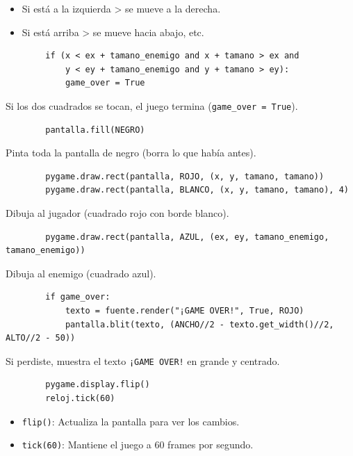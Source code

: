 \documentclass[11.5pt]{article}
\begin{document}
	\begin{itemize}
		\item Si está a la izquierda > se mueve a la derecha.
		\item 	Si está arriba > se mueve hacia abajo, etc.
	\end{itemize}
	
	\begin{verbatim}
		if (x < ex + tamano_enemigo and x + tamano > ex and
			y < ey + tamano_enemigo and y + tamano > ey):
			game_over = True
	\end{verbatim}
	
	Si los dos cuadrados se tocan, el juego termina (\verb|game_over = True|).
	
	\begin{verbatim}
		pantalla.fill(NEGRO)
	\end{verbatim}
	
	Pinta toda la pantalla de negro (borra lo que había antes).
	
	\begin{verbatim}
		pygame.draw.rect(pantalla, ROJO, (x, y, tamano, tamano))
		pygame.draw.rect(pantalla, BLANCO, (x, y, tamano, tamano), 4)
	\end{verbatim}
	
	Dibuja al jugador (cuadrado rojo con borde blanco).
	
	\begin{verbatim}
		pygame.draw.rect(pantalla, AZUL, (ex, ey, tamano_enemigo, tamano_enemigo))
	\end{verbatim}
	
	Dibuja al enemigo (cuadrado azul).
	
	\begin{verbatim}
		if game_over:
			texto = fuente.render("¡GAME OVER!", True, ROJO)
			pantalla.blit(texto, (ANCHO//2 - texto.get_width()//2, ALTO//2 - 50))
	\end{verbatim}
	
	Si perdiste, muestra el texto \verb|¡GAME OVER!| en grande y centrado.
	
	\begin{verbatim}
		pygame.display.flip()
		reloj.tick(60)
	\end{verbatim}
	
	\begin{itemize}
		\item \verb|flip()|: Actualiza la pantalla para ver los cambios.
		\item 	\verb|tick(60)|: Mantiene el juego a 60 frames por segundo.
	\end{itemize}
	
\end{document}
